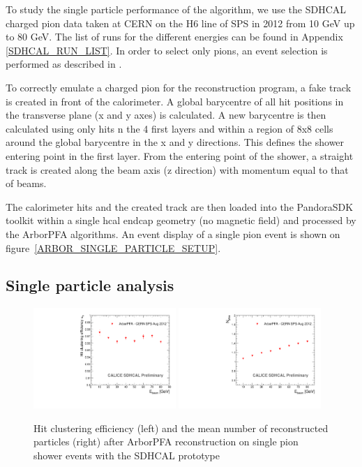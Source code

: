 \documentclass[cits]{JINST}
\begin{document}
To study the single particle performance of the algorithm, we use the SDHCAL charged pion data taken at CERN on the H6 line of SPS in 2012 from 10 GeV up to 80 GeV. The list of runs for the different energies can be found in Appendix \ref{SDHCAL_RUN_LIST}. In order to select only pions, an event selection is performed as described in \cite{sdhcal-paper}.

To correctly emulate a charged pion for the reconstruction program, a fake track is created in front of the calorimeter. A global barycentre of all hit positions in the transverse plane (x and y axes) is calculated. A new barycentre is then calculated using only hits n the 4 first layers and within a region of 8x8 cells around the global barycentre in the x and y directions. This defines the shower entering point in the first layer. From the entering point of the shower, a straight track is created along the beam axis (z direction) with momentum equal to that of beams.

The calorimeter hits and the created track are then loaded into the PandoraSDK toolkit \cite{pandora-sdk} within a single hcal endcap geometry (no magnetic field) and processed by the ArborPFA algorithms. An event display of a single pion event is shown on figure~\ref{ARBOR_SINGLE_PARTICLE_SETUP}.

\subsection{Single particle analysis}

\begin{figure}[!h]
  \begin{center}
    \includegraphics[width=0.48\textwidth]{plots/SingleParticle_Efficiency.pdf}
    \includegraphics[width=0.48\textwidth]{plots/SingleParticle_NPfos.pdf} \\
  \end{center}
  \caption{\label{ARBOR_SINGLE_PARTICLE_EFFICIENCY_AND_NPFOS} Hit clustering efficiency (left) and the mean number of reconstructed particles (right) after ArborPFA reconstruction on single pion shower events with the SDHCAL prototype}
\end{figure}
\end{document}
